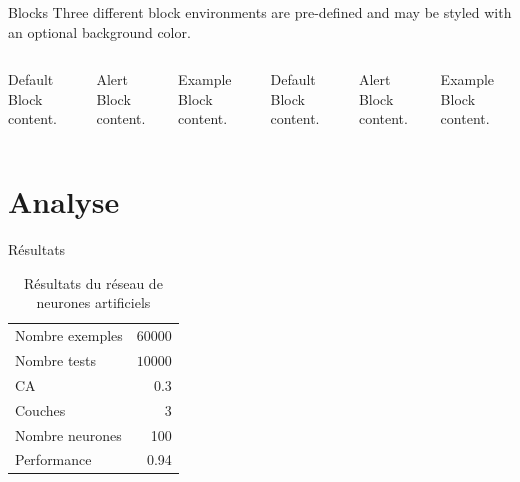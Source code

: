 \documentclass[10pt]{beamer}
\begin{document}
\begin{frame}{Blocks}
  Three different block environments are pre-defined and may be styled with an
  optional background color.

  \begin{columns}[T,onlytextwidth]
      \begin{block}{Default}
        Block content.
      \end{block}

      \begin{alertblock}{Alert}
        Block content.
      \end{alertblock}

      \begin{exampleblock}{Example}
        Block content.
      \end{exampleblock}



      \begin{block}{Default}
        Block content.
      \end{block}

      \begin{alertblock}{Alert}
        Block content.
      \end{alertblock}

      \begin{exampleblock}{Example}
        Block content.
      \end{exampleblock}

  \end{columns}
\end{frame}

\section{Analyse}

\begin{frame}{R\'esultats}
  \begin{table}
    \caption{R\'esultats du r\'eseau de neurones artificiels}
    \begin{tabular}{lr}
      \toprule
      Nombre exemples & $60000$\\
	  Nombre tests & $10000$\\
      CA & 0.3\\
      Couches  & 3\\
      Nombre neurones & 100\\
      Performance & 0.94\\
      \bottomrule
    \end{tabular}
  \end{table}
\end{frame}
\end{document}
